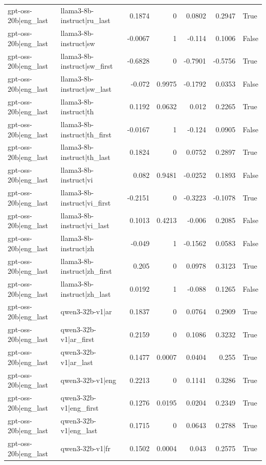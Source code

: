 \begin{table}
\begin{tabular}{l l r r r r l}
gpt-oss-20b|eng_last & llama3-8b-instruct|ru_last & 0.1874 & 0 & 0.0802 & 0.2947 & True \\
gpt-oss-20b|eng_last & llama3-8b-instruct|sw & -0.0067 & 1 & -0.114 & 0.1006 & False \\
gpt-oss-20b|eng_last & llama3-8b-instruct|sw_first & -0.6828 & 0 & -0.7901 & -0.5756 & True \\
gpt-oss-20b|eng_last & llama3-8b-instruct|sw_last & -0.072 & 0.9975 & -0.1792 & 0.0353 & False \\
gpt-oss-20b|eng_last & llama3-8b-instruct|th & 0.1192 & 0.0632 & 0.012 & 0.2265 & True \\
gpt-oss-20b|eng_last & llama3-8b-instruct|th_first & -0.0167 & 1 & -0.124 & 0.0905 & False \\
gpt-oss-20b|eng_last & llama3-8b-instruct|th_last & 0.1824 & 0 & 0.0752 & 0.2897 & True \\
gpt-oss-20b|eng_last & llama3-8b-instruct|vi & 0.082 & 0.9481 & -0.0252 & 0.1893 & False \\
gpt-oss-20b|eng_last & llama3-8b-instruct|vi_first & -0.2151 & 0 & -0.3223 & -0.1078 & True \\
gpt-oss-20b|eng_last & llama3-8b-instruct|vi_last & 0.1013 & 0.4213 & -0.006 & 0.2085 & False \\
gpt-oss-20b|eng_last & llama3-8b-instruct|zh & -0.049 & 1 & -0.1562 & 0.0583 & False \\
gpt-oss-20b|eng_last & llama3-8b-instruct|zh_first & 0.205 & 0 & 0.0978 & 0.3123 & True \\
gpt-oss-20b|eng_last & llama3-8b-instruct|zh_last & 0.0192 & 1 & -0.088 & 0.1265 & False \\
gpt-oss-20b|eng_last & qwen3-32b-v1|ar & 0.1837 & 0 & 0.0764 & 0.2909 & True \\
gpt-oss-20b|eng_last & qwen3-32b-v1|ar_first & 0.2159 & 0 & 0.1086 & 0.3232 & True \\
gpt-oss-20b|eng_last & qwen3-32b-v1|ar_last & 0.1477 & 0.0007 & 0.0404 & 0.255 & True \\
gpt-oss-20b|eng_last & qwen3-32b-v1|eng & 0.2213 & 0 & 0.1141 & 0.3286 & True \\
gpt-oss-20b|eng_last & qwen3-32b-v1|eng_first & 0.1276 & 0.0195 & 0.0204 & 0.2349 & True \\
gpt-oss-20b|eng_last & qwen3-32b-v1|eng_last & 0.1715 & 0 & 0.0643 & 0.2788 & True \\
gpt-oss-20b|eng_last & qwen3-32b-v1|fr & 0.1502 & 0.0004 & 0.043 & 0.2575 & True \\

\end{tabular}
\end{table}
